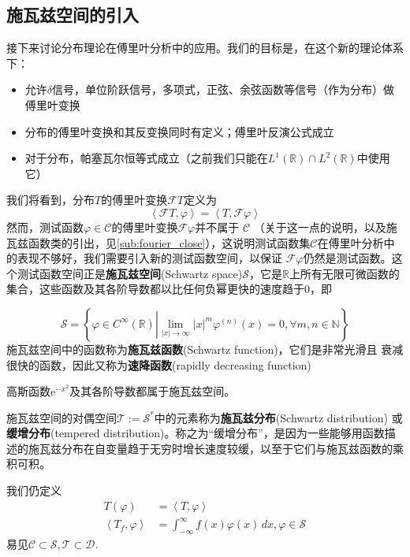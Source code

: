 \subsection{施瓦兹空间的引入}\label{sub:schwartz}
接下来讨论分布理论在傅里叶分析中的应用。我们的目标是，在这个新的理论体系下：
\begin{itemize}
    \item 允许$\delta$信号，单位阶跃信号，多项式，正弦、余弦函数等信号（作为分布）做傅里叶变换
    \item 分布的傅里叶变换和其反变换同时有定义；傅里叶反演公式成立
    \item 对于分布，帕塞瓦尔恒等式成立（之前我们只能在$L^1(\mathbb{R})\cap L^2(\mathbb{R})$中使用它）
\end{itemize}
我们将看到，分布$T$的傅里叶变换$\mathcal{F} T$定义为
\begin{equation}
    \left\langle\mathcal{F}T,\varphi\right\rangle=\left\langle T,\mathcal{F}\varphi\right\rangle
\end{equation}
然而，测试函数$\varphi\in\mathcal{C} $的傅里叶变换$\mathcal{F}\varphi$并不属于
$\mathcal{C} $
（关于这一点的说明，以及施瓦兹函数类的引出，见\ref{sub:fourier_close}），这说明测试函数集$\mathcal{C} $在傅里叶分析中的表现不够好，我们需要引入新的测试函数空间，以保证
$\mathcal{F}\varphi$仍然是测试函数。这个测试函数空间正是\textbf{施瓦兹空间}(Schwartz space)$\mathcal{S} $\cite{brad_osgood_ee261}，它是$\mathbb{R}$上所有无限可微函数的集合，这些函数及其各阶导数都以比任何负幂更快的速度趋于0，即
\begin{definition}[施瓦兹空间与施瓦兹函数]
    \[\mathcal{S} =\left\{\varphi\in C^{\infty}(\mathbb{R} )\left|\lim_{|x|\to\infty}|x|^m\varphi^{(n)}(x)=0,\forall m,n\in\mathbb{N} \right.\right\}\]
施瓦兹空间中的函数称为\textbf{施瓦兹函数}(Schwartz function)，它们是非常光滑且
衰减很快的函数，因此又称为\textbf{速降函数}(rapidly decreasing function)
\end{definition}
\begin{example}
高斯函数$\mathrm{e}^{-x^2}$及其各阶导数都属于施瓦兹空间。
\end{example}
\begin{definition}[施瓦兹分布]
    施瓦兹空间的对偶空间$\mathcal{T} :=\mathcal{S}^*$中的元素称为\textbf{施瓦兹分布}(Schwartz distribution)
或\textbf{缓增分布}(tempered distribution)。称之为“缓增分布”，是因为一些能够用函数描述的施瓦兹分布在自变量趋于无穷时增长速度较缓，以至于它们与施瓦兹函数的乘积可积。
\end{definition}
我们仍定义
\begin{align}
    T(\varphi)                 & =\left\langle T,\varphi\right\rangle                                        \\
    \left\langle T_f,\varphi\right\rangle & =\int_{-\infty}^{\infty}f(x)\varphi(x)\,dx,\varphi\in\mathcal{S}
\end{align}
易见$\mathcal{C} \subset \mathcal{S} ,\mathcal{T} \subset\mathcal{D}. $

